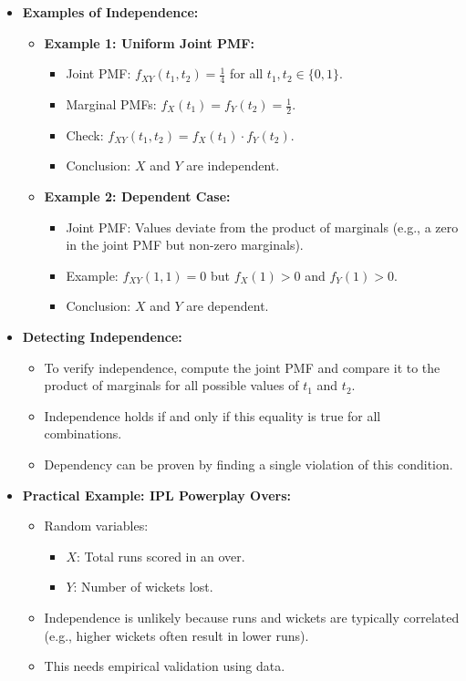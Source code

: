 \documentclass{article}
\begin{document}
\begin{itemize}
  \item \textbf{Examples of Independence:}
    \begin{itemize}
      \item \textbf{Example 1: Uniform Joint PMF:}
        \begin{itemize}
          \item Joint PMF: $f_{XY}(t_1, t_2) = \frac{1}{4}$ for all $t_1, t_2 \in \{0, 1\}$.
          \item Marginal PMFs: $f_X(t_1) = f_Y(t_2) = \frac{1}{2}$.
          \item Check: $f_{XY}(t_1, t_2) = f_X(t_1) \cdot f_Y(t_2)$.
          \item Conclusion: $X$ and $Y$ are independent.
        \end{itemize}
      \item \textbf{Example 2: Dependent Case:}
        \begin{itemize}
          \item Joint PMF: Values deviate from the product of marginals (e.g., a zero in the joint PMF but non-zero marginals).
          \item Example: $f_{XY}(1, 1) = 0$ but $f_X(1) > 0$ and $f_Y(1) > 0$.
          \item Conclusion: $X$ and $Y$ are dependent.
        \end{itemize}
    \end{itemize}

  \item \textbf{Detecting Independence:}
    \begin{itemize}
      \item To verify independence, compute the joint PMF and compare it to the product of marginals for all possible values of $t_1$ and $t_2$.
      \item Independence holds if and only if this equality is true for all combinations.
      \item Dependency can be proven by finding a single violation of this condition.
    \end{itemize}

  \item \textbf{Practical Example: IPL Powerplay Overs:}
    \begin{itemize}
      \item Random variables:
        \begin{itemize}
          \item $X$: Total runs scored in an over.
          \item $Y$: Number of wickets lost.
        \end{itemize}
      \item Independence is unlikely because runs and wickets are typically correlated (e.g., higher wickets often result in lower runs).
      \item This needs empirical validation using data.
    \end{itemize}
\end{itemize}
\end{document}
